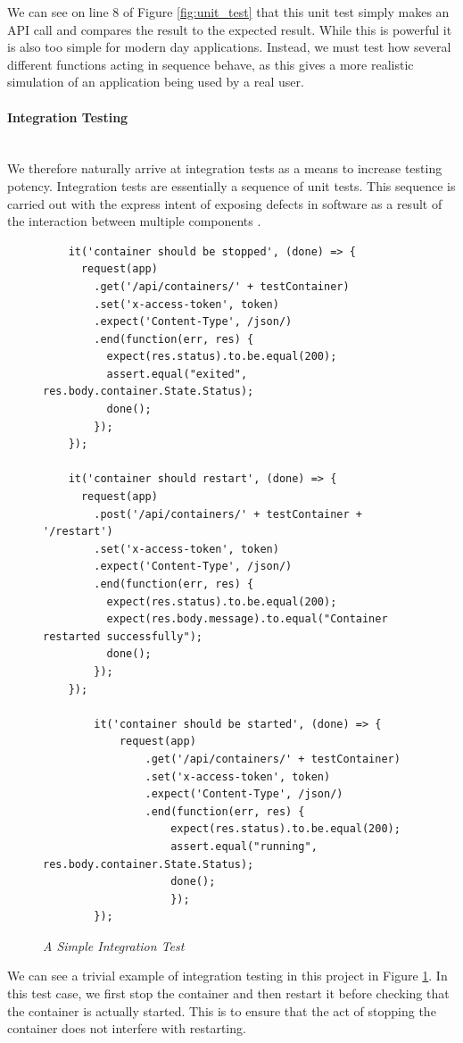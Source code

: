 We can see on line 8 of Figure \ref{fig:unit_test} that this unit test simply makes an \gls{API} call and compares the result to the expected result. While this is powerful it is also too simple for modern day applications. Instead, we must test how several different functions acting in sequence behave, as this gives a more realistic simulation of an application being used by a real user.

\paragraph{Integration Testing}\mbox{}\\
We therefore naturally arrive at integration tests as a means to increase testing potency. Integration tests are essentially a sequence of unit tests. This sequence is carried out with the express intent of exposing defects in software as a result of the interaction between multiple components \citep{IntegrationTesting2017}.


\begin{figure}[!ht]
\begin{lstlisting}
	it('container should be stopped', (done) => {
      request(app)
        .get('/api/containers/' + testContainer)
        .set('x-access-token', token)
        .expect('Content-Type', /json/)
        .end(function(err, res) {
          expect(res.status).to.be.equal(200);
          assert.equal("exited", res.body.container.State.Status);
          done();
        });
    });

    it('container should restart', (done) => {
      request(app)
        .post('/api/containers/' + testContainer + '/restart')
        .set('x-access-token', token)
        .expect('Content-Type', /json/)
        .end(function(err, res) {
          expect(res.status).to.be.equal(200);
          expect(res.body.message).to.equal("Container restarted successfully");
          done();
        });
    });
		
		it('container should be started', (done) => {
			request(app)
				.get('/api/containers/' + testContainer)
				.set('x-access-token', token)
				.expect('Content-Type', /json/)
				.end(function(err, res) {
					expect(res.status).to.be.equal(200);
					assert.equal("running", res.body.container.State.Status);
					done();
					});
		});
\end{lstlisting}
\caption{\em A Simple Integration Test}
\label{fig:integration_test}
\end{figure}

We can see a trivial example of integration testing in this project in Figure \ref{fig:integration_test}. In this test case, we first stop the container and then restart it before checking that the container is actually started. This is to ensure that the act of stopping the container does not interfere with restarting.

